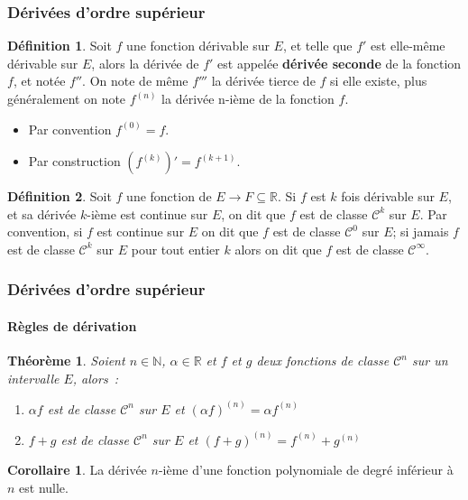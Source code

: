 \documentclass[10pt,notheorems]{beamer}
\theoremstyle{plain}
\newtheorem{theorem}{Théorème}
\theoremstyle{definition} %
\newtheorem{definition}{Définition}
\newtheorem{corollary}{Corollaire}%
\begin{document}
\begin{frame}
  \frametitle{Dérivées d'ordre supérieur}
  \hypertarget{slide_derivees_ordre_n_1}{}

  \begin{definition}
    Soit $f$ une fonction dérivable sur $E$, et telle que $f'$ est elle-même dérivable sur $E$, alors la dérivée de $f'$ est appelée \textbf{dérivée seconde} de la fonction $f$, et notée $f''$. On note de même $f'''$ la dérivée tierce de $f$ si elle existe, plus généralement on note $f^{(n)}$ la dérivée n-ième de la fonction $f$.
  \end{definition}

  \bigskip

  \begin{itemize}
  \item Par convention $f^{(0)} = f$.\newline
  \item Par construction $\left(f^{(k)}\right)' = f^{(k+1)}$.\newline
  \end{itemize}


  \begin{definition}
    Soit $f$ une fonction de $E\rightarrow F\subseteq \mathbb R$. Si $f$ est $k$ fois dérivable sur $E$, et sa dérivée $k$-ième est continue sur $E$, on dit que $f$ est de classe $\mathcal C^k$ sur $E$. Par convention, si $f$ est continue sur $E$ on dit que $f$ est de classe $\mathcal C^0$ sur $E$; si jamais $f$ est de classe $\mathcal C^k$ sur $E$ pour tout entier $k$ alors on dit que $f$ est de classe $\mathcal C^{\infty}$.
  \end{definition}

\end{frame}


\begin{frame}
  \frametitle{Dérivées d'ordre supérieur}
  \framesubtitle{Règles de dérivation}
  \hypertarget{slide_derivees_ordre_n_2}{}

  \begin{theorem}
    Soient $n\in\mathbb N$, $\alpha\in \mathbb R$ et $f$ et $g$ deux fonctions de classe $\mathcal C^n$ sur un intervalle $E$, alors~:\newline
    \begin{enumerate}
    \item $\alpha f$ est de classe $\mathcal C^n$ sur $E$ et $\left(\alpha f\right)^{(n)} = \alpha f^{(n)}$\newline
    \item $f+g$  est de classe $\mathcal C^n$ sur $E$ et $\left(f+g\right)^{(n)} = f^{(n)} + g^{(n)}$
    \end{enumerate}
  \end{theorem}

  \bigskip

  \begin{corollary}
    La dérivée $n$-ième d'une fonction polynomiale de degré inférieur à $n$ est nulle.
  \end{corollary}

\end{frame}
\end{document}
